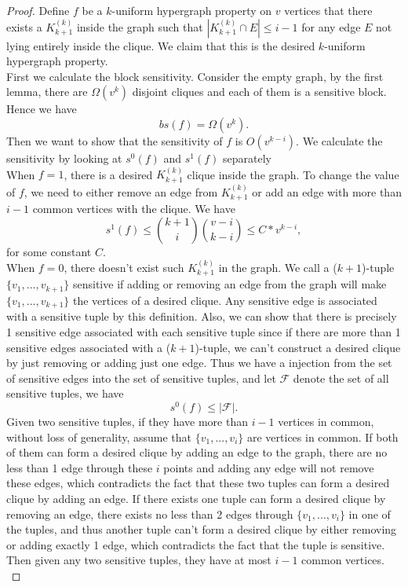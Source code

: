 \documentclass[psamsfonts]{amsart}
\theoremstyle{definition}
\theoremstyle{remark}
\numberwithin{equation}{section}
\begin{document}
	\begin{proof}
		Define $f$ be a $k$-uniform hypergraph property on $v$ vertices that there exists a $K_{k+1}^{(k)}$ inside the graph such that $|K_{k+1}^{(k)} \cap E| \leq  i-1$ for any edge $E$ not lying entirely inside the clique. We claim that this is the desired $k$-uniform hypergraph property.\\
		\indent First we calculate the block sensitivity. Consider the empty graph, by the first lemma, there are $\Omega (v^k)$ disjoint cliques and each of them is a sensitive block. Hence we have 
		\begin{equation}
			bs(f) = \Omega (v^k).
		\end{equation}
		\indent Then we want to show that the sensitivity of $f$ is $O(v^{k-i})$. We calculate the sensitivity by looking at $s^0(f)$ and $s^1(f)$ separately\\
		\indent When $f=1$, there is a desired $K_{k+1}^{(k)}$ clique inside the graph. To change the value of $f$, we need to either remove an edge from $K_{k+1}^{(k)}$ or add an edge with more than $i-1$ common vertices with the clique. We have
		\begin{equation}
			s^1(f) \leq {k+1 \choose{i}}{v-i \choose{k-i}} \leq C*v^{k-i},
		\end{equation}
		for some constant $C$.\\
		\indent When $f=0$, there doesn't exist such $K_{k+1}^{(k)}$ in the graph. We call a ($k+1$)-tuple $\{v_1,...,v_{k+1}\}$ sensitive if adding or removing an edge from the graph will make $\{v_1,...,v_{k+1}\}$ the vertices of a desired clique. Any sensitive edge is associated with a sensitive tuple by this definition. Also, we can show that there is precisely 1 sensitive edge associated with each sensitive tuple since if there are more than 1 sensitive edges associated with a ($k+1$)-tuple, we can't construct a desired clique by just removing or adding just one edge. Thus we have a injection from the set of sensitive edges into the set of sensitive tuples, and let $\mathcal{F}$ denote the set of all sensitive tuples, we have
		\begin{equation}
			s^0(f) \leq |\mathcal{F}|.
		\end{equation}
		\indent Given two sensitive tuples, if they have more than $i-1$ vertices in common, without loss of generality, assume that $\{v_1,...,v_i\}$ are vertices in common. If both of them can form a desired clique by adding an edge to the graph, there are no less than 1 edge through these $i$ points and adding any edge will not remove these edges, which contradicts the fact that these two tuples can form a desired clique by adding an edge. If there exists one tuple can form a desired clique by removing an edge, there exists no less than 2 edges through $\{v_1,...,v_i\}$ in one of the tuples, and thus another tuple can't form a desired clique by either removing or adding exactly 1 edge, which contradicts the fact that the tuple is sensitive. Then given any two sensitive tuples, they have at most $i-1$ common vertices.\\

\end{proof}
\end{document}
